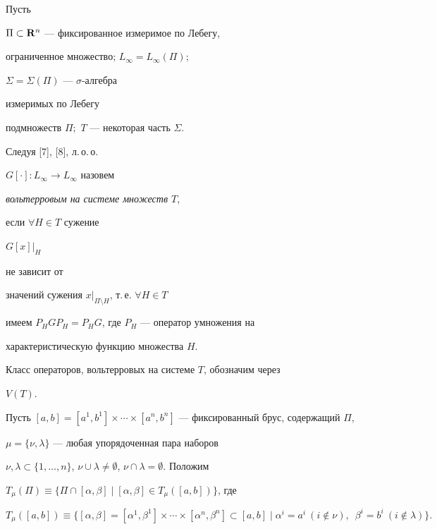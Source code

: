 Пусть


$\Pi \subset {\bold R}^n$ --- фиксированное измеримое по Лебегу,


ограниченное множество; $L_{\infty}=L_{\infty}(\Pi)$;


$\Sigma =\Sigma (\Pi)$ --- $\sigma$-алгебра


измеримых по Лебегу


подмножеств $\Pi;$ $T$ --- некоторая часть $\Sigma$.


Следуя [7], [8], л.\,о.\,о.


$G[\cdot]:L_{\infty}\longrightarrow L_{\infty}$ назовем


{\it вольтерровым на системе множеств $T$},


если $\forall H\in T$ сужение 


${G[x]}\big|_H$ 


не зависит от


значений сужения $x\big|_{\Pi\setminus H}$, т.\,е. $\forall H\in T$


имеем $P_HGP_H=P_HG$, где $P_H$ --- оператор умножения на 


характеристическую функцию множества $H$. 


Класс операторов, вольтерровых на системе $T$, обозначим через


$V(T)$.


Пусть $[a,b]=[a^1,b^1]\times


\dotsb \times [a^n,b^n]$ --- фиксированный брус, содержащий $\Pi$,


$\mu =\{ \nu ,\lambda \}$ --- любая упорядоченная пара наборов


$\nu ,\lambda \subset \{ 1, \dotsc ,n \}$, $\nu \cup \lambda


\ne \emptyset$, $\nu \cap \lambda = \emptyset$. Положим 


$T_{\mu}(\Pi)\equiv\{ \Pi \cap [\alpha ,\beta ] \mid


[\alpha ,\beta ] \in T_{\mu}([a,b]) \}$, где


$$


T_{\mu}([a,b])\equiv\{ [\alpha ,\beta ] = [{\alpha}^1, {\beta}^1] \times


\dotsb \times [{\alpha}^n,


{\beta}^n] \subset [a,b]\mid {\alpha}^i=a^i\ (i \notin \nu ),


\ \; {\beta}^i=b^i\ (i \notin \lambda ) \}. 


$$





